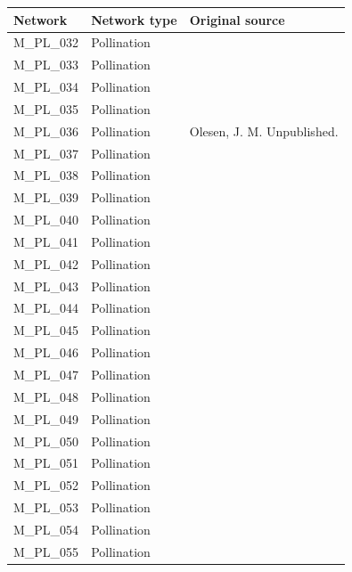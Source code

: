 \documentclass[12pt]{article}
\begin{document}
\begin{spacing}{1.5}
    \begin{table}[h!]
    \begin{center}
    \begin{tabular}{|l l m{6cm} |}
    \hline
    Network & Network type & Original source \\
    \hline
    M\_PL\_032  & Pollination & \citep{Schemske1978}  \\
    M\_PL\_033  & Pollination & \citep{Small1976} \\
    M\_PL\_034  & Pollination & \citep{SmithRamirez2005}  \\
    M\_PL\_035  & Pollination & \citep{Percival1974}  \\
    M\_PL\_036  & Pollination & Olesen, J. M. Unpublished.  \\
    M\_PL\_037  & Pollination & \citep{Montero2005} \\
    M\_PL\_038  & Pollination & \citep{Montero2005} \\
    M\_PL\_039  & Pollination & \citep{Stald2003} \\
    M\_PL\_040  & Pollination & \citep{Ingversen2006} \\
    M\_PL\_041  & Pollination & \citep{Ingversen2006} \\
    M\_PL\_042  & Pollination & \citep{Philipp2006} \\
    M\_PL\_043  & Pollination & \citep{Montero2005} \\
    M\_PL\_044  & Pollination & \citep{Kato2000}  \\
    M\_PL\_045  & Pollination & \citep{Lundgren2005}  \\
    M\_PL\_046  & Pollination & \citep{Bundgaard2003} \\
    M\_PL\_047  & Pollination & \citep{Dupont2009a}  \\
    M\_PL\_048  & Pollination & \citep{Dupont2009a}  \\
    M\_PL\_049  & Pollination & \citep{Bek2006}  \\
    M\_PL\_050  & Pollination & \citep{Stald2003} \\
    M\_PL\_051  & Pollination & \citep{Vazquez2002} \\
    M\_PL\_052  & Pollination & \citep{Witt1998}  \\
    M\_PL\_053  & Pollination & \citep{Yamazaki2003}  \\
    M\_PL\_054  & Pollination & \citep{Kakutani1990}  \\
    M\_PL\_055  & Pollination & \citep{Kato1996}  \\

\end{tabular}
\end{center}
\end{table}
\end{spacing}
\end{document}
